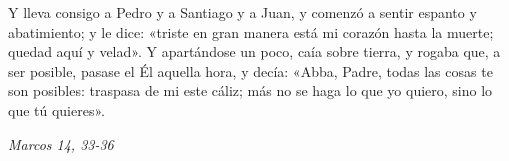 \documentclass[../../devocionario.tex]{subfiles}
\begin{document}
    Y lleva consigo a Pedro y a Santiago y a Juan, y comenzó a sentir espanto y abatimiento; y le dice: 
    «triste en gran manera está mi corazón hasta la muerte; quedad aquí y velad». Y apartándose un poco, 
    caía sobre tierra, y rogaba que, a ser posible, pasase el Él aquella hora, y decía: «Abba, Padre, todas las cosas te son posibles: 
    traspasa de mi este cáliz; más no se haga lo que yo quiero, sino lo que tú quieres».
    
    \begin{flushright}
        \emph{Marcos 14, 33-36}
    \end{flushright}
\end{document}
